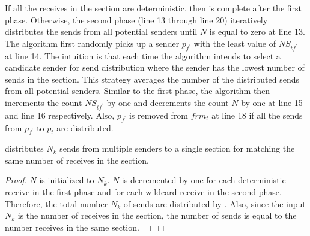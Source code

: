 If all the receives in the section are deterministic, then  is complete after the first phase. 
Otherwise, the second phase (line 13 through line 20) iteratively distributes the sends from all potential senders until $N$ is equal to zero at line 13.
The algorithm first randomly picks up a sender $p_{f^\prime}$ with the least value of $\mathit{NS}_{tf^\prime}$ at line 14. The intuition is that each time the algorithm intends to select a candidate sender for send distribution where the sender has the lowest number of sends in the section. This strategy averages the number of the distributed sends from all potential senders.
Similar to the first phase, the algorithm then increments the count $\mathit{NS}_{tf^\prime}$ by one and decrements the count $N$ by one at line 15 and line 16 respectively. Also, $p_{f^\prime}$ is removed from $frm_t$ at line 18 if all the sends from $p_{f^\prime}$ to $p_t$ are distributed.

\begin{lemma}
 distributes $N_k$ sends from multiple senders to a single section for matching the same number of receives in the section.
\label{lemma:distribute}
\end{lemma}
\begin{proof}
$N$ is initialized to $N_k$. $N$ is decremented by one for each deterministic receive in the first phase and for each wildcard receive in the second phase. Therefore, the total number $N_k$ of sends are distributed by . Also, since the input $N_k$ is the number of receives in the section, the number of sends is equal to the number receives in the same section. 
$\Box$
\end{proof}

